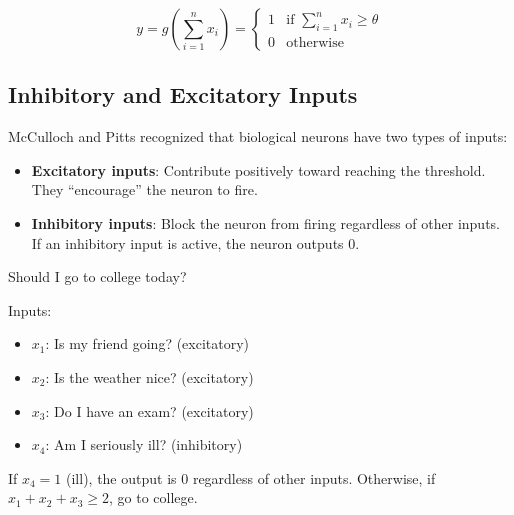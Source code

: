 \[
y = g\left(\sum_{i=1}^{n} x_i\right) = 
\begin{cases}
1 & \text{if } \sum_{i=1}^{n} x_i \geq \theta \\
0 & \text{otherwise}
\end{cases}
\]

\begin{center}
\end{center}

\subsection{Inhibitory and Excitatory Inputs}

McCulloch and Pitts recognized that biological neurons have two types of inputs:

\begin{itemize}
    \item \textbf{Excitatory inputs}: Contribute positively toward reaching the threshold. They ``encourage'' the neuron to fire.
    
    \item \textbf{Inhibitory inputs}: Block the neuron from firing regardless of other inputs. If an inhibitory input is active, the neuron outputs 0.
\end{itemize}

\begin{examplebox}
Should I go to college today?

Inputs:
\begin{itemize}
    \item $x_1$: Is my friend going? (excitatory)
    \item $x_2$: Is the weather nice? (excitatory)
    \item $x_3$: Do I have an exam? (excitatory)
    \item $x_4$: Am I seriously ill? (inhibitory)
\end{itemize}

If $x_4 = 1$ (ill), the output is 0 regardless of other inputs.
Otherwise, if $x_1 + x_2 + x_3 \geq 2$, go to college.
\end{examplebox}

